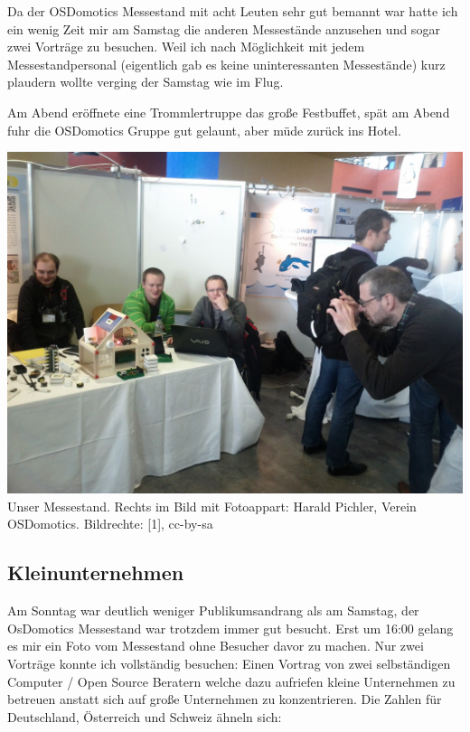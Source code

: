 Da der OSDomotics Messestand mit acht Leuten sehr gut bemannt war hatte ich ein wenig Zeit mir am Samstag die anderen Messestände anzusehen und sogar zwei Vorträge zu besuchen. Weil ich nach Möglichkeit mit jedem Messestandpersonal (eigentlich gab es keine uninteressanten Messestände) kurz plaudern wollte verging der Samstag wie im Flug. 

Am Abend eröffnete eine Trommlertruppe das große Festbuffet, spät am Abend fuhr die OSDomotics Gruppe gut gelaunt, aber müde zurück ins Hotel.

\begin{center}
\includegraphics[width=\linewidth]{chemnitz/chemnitz_puppenhaus.jpg}
\footnotesize{Unser Messestand. Rechts im Bild mit Fotoappart: Harald Pichler, Verein OSDomotics. Bildrechte: [1],  cc-by-sa}
\end{center}

\subsection*{Kleinunternehmen}

Am Sonntag war deutlich weniger Publikumsandrang als am Samstag, der OsDomotics Messestand war trotzdem immer gut besucht. Erst um 16:00 gelang es mir ein Foto vom Messestand ohne Besucher davor zu machen. Nur zwei Vorträge konnte ich vollständig besuchen: Einen Vortrag von zwei selbständigen Computer / Open Source Beratern welche dazu aufriefen kleine Unternehmen zu betreuen anstatt sich auf große Unternehmen zu konzentrieren. Die Zahlen für Deutschland, Österreich und Schweiz ähneln sich: 

